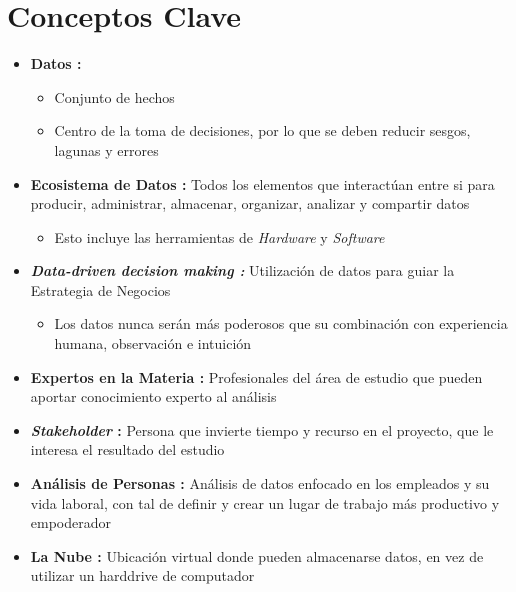 \section{Conceptos Clave}
\begin{itemize}
    \item {\textbf{Datos : }
    \begin{itemize}
        \item {Conjunto de hechos}
        \item {Centro de la toma de decisiones, por lo que se deben reducir sesgos, lagunas y errores}
    \end{itemize}}
    \item {\textbf{Ecosistema de Datos : }Todos los elementos que interactúan entre si para producir, administrar, almacenar, organizar, analizar y compartir datos
    \begin{itemize}
        \item {Esto incluye las herramientas de \textit{Hardware} y \textit{Software}}
    \end{itemize}}
    \item {\textbf{\textit{Data-driven decision making : }}Utilización de datos para guiar la Estrategia de Negocios 
    \begin{itemize}
        \item {Los datos nunca serán más poderosos que su combinación con experiencia humana, observación e intuición}
    \end{itemize}}
    \item {\textbf{Expertos en la Materia : }Profesionales del área de estudio que pueden aportar conocimiento experto al análisis}
    \item {\textbf{\textit{Stakeholder} : }Persona que invierte tiempo y recurso en el proyecto, que le interesa el resultado del estudio}
    
    \item {\textbf{Análisis de Personas : }Análisis de datos enfocado en los empleados y su vida laboral, con tal de definir y crear un lugar de trabajo más productivo y empoderador}
    
    \item {\textbf{La Nube : }Ubicación virtual donde pueden almacenarse datos, en vez de utilizar un harddrive de computador}
\end{itemize}

